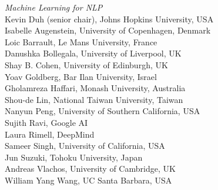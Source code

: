 \emph{Machine Learning for NLP} \\
\hspace*{0.2in}Kevin Duh (senior chair), Johns Hopkins University, USA \\
\hspace*{0.2in}Isabelle Augenstein, University of Copenhagen, Denmark \\
\hspace*{0.2in}Loic Barrault, Le Mans University, France \\
\hspace*{0.2in}Danushka Bollegala, University of Liverpool, UK \\
\hspace*{0.2in}Shay B. Cohen, University of Edinburgh, UK \\
\hspace*{0.2in}Yoav Goldberg, Bar Ilan University, Israel \\
\hspace*{0.2in}Gholamreza Haffari, Monash University, Australia \\
\hspace*{0.2in}Shou-de Lin, National Taiwan University, Taiwan \\
\hspace*{0.2in}Nanyun Peng, University of Southern California, USA \\
\hspace*{0.2in}Sujith Ravi, Google AI \\
\hspace*{0.2in}Laura Rimell, DeepMind \\
\hspace*{0.2in}Sameer Singh, University of California, USA \\
\hspace*{0.2in}Jun Suzuki, Tohoku University, Japan \\
\hspace*{0.2in}Andreas Vlachos, University of Cambridge, UK \\
\hspace*{0.2in}William Yang Wang, UC Santa Barbara, USA 


